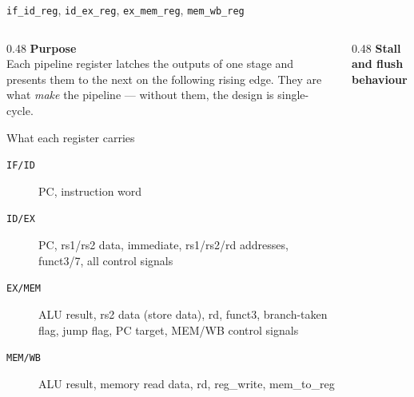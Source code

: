 \documentclass[aspectratio=169,10pt]{beamer}
\begin{document}
\begin{frame}{\texttt{if\_id\_reg}, \texttt{id\_ex\_reg}, \texttt{ex\_mem\_reg}, \texttt{mem\_wb\_reg}}
  \begin{columns}[T]
    \begin{column}{0.48\textwidth}
      \textbf{Purpose}\\
      Each pipeline register latches the outputs of one stage and presents them to the next on the following rising edge.
      They are what \emph{make} the pipeline --- without them, the design is single-cycle.

      \vspace{0.6em}
      \begin{block}{What each register carries}
        \small
        \begin{description}
          \item[\texttt{IF/ID}] PC, instruction word
          \item[\texttt{ID/EX}] PC, rs1/rs2 data, immediate, rs1/rs2/rd addresses, funct3/7, all control signals
          \item[\texttt{EX/MEM}] ALU result, rs2 data (store data), rd, funct3, branch-taken flag, jump flag, PC target, MEM/WB control signals
          \item[\texttt{MEM/WB}] ALU result, memory read data, rd, reg\_write, mem\_to\_reg
        \end{description}
      \end{block}
    \end{column}
    \begin{column}{0.48\textwidth}
      \textbf{Stall and flush behaviour}

      \vspace{0.3em}
\end{column}
\end{columns}
\end{frame}
\end{document}
